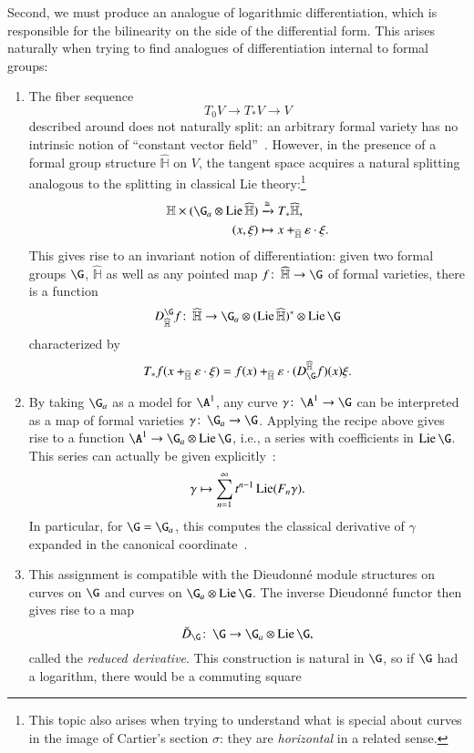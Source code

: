 Second, we must produce an analogue of logarithmic differentiation, which is responsible for the bilinearity on the side of the differential form.  This arises naturally when trying to find analogues of differentiation internal to formal groups:
\begin{enumerate}
    \item The fiber sequence \[T_0 V \to T_* V \to V\] described around  does not naturally split: an arbitrary formal variety has no intrinsic notion of ``constant vector field''~\cite[V.11.12]{LazardCFGs}.  However, in the presence of a formal group structure $\widehat{\mathbb H}$ on $V$, the tangent space acquires a natural splitting analogous to the splitting in classical Lie theory:\footnote{This topic also arises when trying to understand what is special about curves in the image of Cartier's section $\sigma$: they are \emph{horizontal} in a related sense.}
    \begin{align*}
    \mathbb H \times (\G_a \otimes \Lie \widehat{\mathbb H}) & \xrightarrow{\cong} T_* \widehat{\mathbb H}, \\
    (x, \xi) & \mapsto x +_{\widehat{\mathbb H}} \eps \cdot \xi.
    \end{align*}
    This gives rise to an invariant notion of differentiation: given two formal groups $\G$, $\widehat{\mathbb H}$ as well as any pointed map $f\co \widehat{\mathbb H} \to \G$ of formal varieties, there is a function \[D_{\widehat{\mathbb H}}^{\G} f\co \widehat{\mathbb H} \to \G_a \otimes (\Lie \widehat{\mathbb H})^* \otimes \Lie \G\] characterized by \[T_* f(x +_{\widehat{\mathbb H}} \eps \cdot \xi) = f(x) +_{\widehat{\mathbb H}} \eps \cdot (D_{\G}^{\widehat{\mathbb H}} f)(x) \xi.\]
    \item By taking $\G_a$ as a model for $\A^1$, any curve $\gamma\co \A^1 \to \G$ can be interpreted as a map of formal varieties $\gamma\co \G_a \to \G$.  Applying the recipe above gives rise to a function $\A^1 \to \G_a \otimes \Lie \G$, i.e., a series with coefficients in $\Lie \G$.  This series can actually be given explicitly~\cite[V.7.3]{LazardCFGs}: \[\gamma \mapsto \sum_{n=1}^\infty t^{n-1} \operatorname{Lie}(F_n \gamma).\]  In particular, for $\G = \G_a$, this computes the classical derivative of $\gamma$ expanded in the canonical coordinate~\cite[V.7.13]{LazardCFGs}.
    \item This assignment is compatible with the Dieudonn\'e module structures on curves on $\G$ and curves on $\G_a \otimes \Lie \G$.  The inverse Dieudonn\'e functor then gives rise to a map \[\breve D_{\G}\co \G \to \G_a \otimes \Lie \G,\] called the \textit{reduced derivative}.  This construction is natural in $\G$, so if $\G$ had a logarithm, there would be a commuting square

\end{enumerate}
